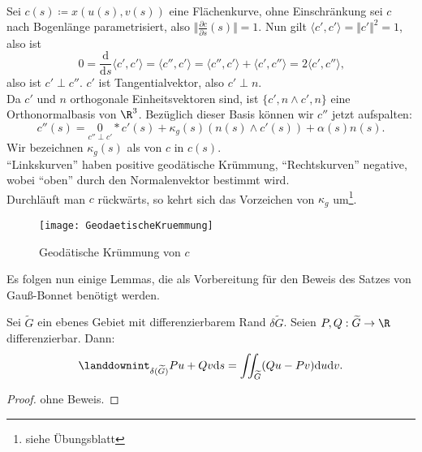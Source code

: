 \begin{definition}
  \  \\
  Sei \( c(s) \coloneqq x(u(s), v(s)) \) eine Flächenkurve, ohne Einschränkung sei \( c \) nach Bogenlänge parametrisiert, also \( \Vert \frac{\partial c}{\partial s} (s) \Vert = 1 \). Nun gilt \( \langle c', c' \rangle = \Vert c' \Vert^2 = 1 \), also ist
  \begin{equation*}
    0 = \frac{\text{d}}{\text{d}s}\langle c', c' \rangle = \langle c'', c' \rangle = \langle c'', c' \rangle + \langle c', c'' \rangle = 2\langle c', c'' \rangle\text{,}
  \end{equation*}
  also ist \( c' \perp c'' \). \( c' \) ist Tangentialvektor, also \( c' \perp n \). \\
  Da \( c' \) und \( n \) orthogonale Einheitsvektoren sind, ist \( \{ c', n \wedge c', n \} \) eine Orthonormalbasis von \( \R^3 \). Bezüglich dieser Basis können wir \( c'' \) jetzt aufspalten:
  \begin{equation*}
    c''(s) = \underset{c'' \perp c'}{0}*c'(s) + \kappa_g(s)(n(s) \wedge c'(s)) + \alpha(s)n(s)\text{.}
  \end{equation*}
  Wir bezeichnen \( \kappa_g(s) \) als \label{def:geodaetischeKruemmung} von \( c \) in \( c(s) \). \\
  ``Linkskurven'' haben positive geodätische Krümmung, ``Rechtskurven'' negative, wobei ``oben'' durch den Normalenvektor bestimmt wird. \\
  Durchläuft man \( c \) rückwärts, so kehrt sich das Vorzeichen von \( \kappa_g \) um\footnote{siehe Übungsblatt}.
  \begin{figure}[H]
    \texttt{[image: GeodaetischeKruemmung]}
    \caption{Geodätische Krümmung von \( c \)}
  \end{figure}
\end{definition}


Es folgen nun einige Lemmas, die als Vorbereitung für den Beweis des Satzes von Gauß-Bonnet benötigt werden.

\begin{lemma}
  Sei \( \widetilde{G} \) ein ebenes Gebiet mit differenzierbarem Rand \( \delta\widetilde{G} \). Seien \( P,Q : \widetilde{G} \to \R \) differenzierbar. Dann:
  \begin{equation*}
     \landdownint_{\delta(\widetilde{G})}Pu+Qv \text{d}s = \iint_{\widetilde{G}}(Qu-Pv)\text{d}u\text{d}v\text{.}
  \end{equation*} 
  \begin{proof}
    ohne Beweis.
  \end{proof}
\end{lemma}


